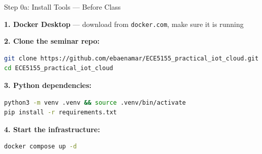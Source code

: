 \documentclass[aspectratio=169,11pt]{beamer}
\begin{document}
\begin{frame}[fragile]{Step 0a: Install Tools --- Before Class}

    \vspace{0.2cm}
    \textbf{1. Docker Desktop} --- download from \texttt{docker.com}, make sure it is running

    \vspace{0.1cm}
    \textbf{2. Clone the seminar repo:}
\begin{lstlisting}[language=bash]
git clone https://github.com/ebaenamar/ECE5155_practical_iot_cloud.git
cd ECE5155_practical_iot_cloud
\end{lstlisting}

    \vspace{0.1cm}
    \textbf{3. Python dependencies:}
\begin{lstlisting}[language=bash]
python3 -m venv .venv && source .venv/bin/activate
pip install -r requirements.txt
\end{lstlisting}

    \vspace{0.1cm}
    \textbf{4. Start the infrastructure:}
\begin{lstlisting}[language=bash]
docker compose up -d
\end{lstlisting}
\end{frame}
\end{document}
